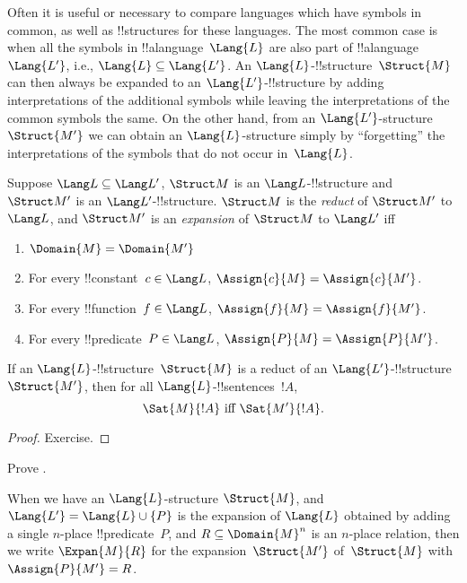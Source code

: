 \documentclass[../../../include/open-logic-section]{subfiles}
\begin{document}

Often it is useful or necessary to compare languages which have
symbols in common, as well as !!{structure}s for these languages.  The
most common case is when all the symbols in !!a{language}~$\Lang{L}$
are also part of !!a{language}~$\Lang{L'}$, i.e., $\Lang{L} \subseteq
\Lang{L'}$. An $\Lang{L}$-!!{structure}~$\Struct{M}$ can then always
be expanded to an $\Lang{L'}$-!!{structure} by adding interpretations
of the additional symbols while leaving the interpretations of the
common symbols the same.  On the other hand, from an
$\Lang{L'}$-structure~$\Struct{M'}$ we can obtain an
$\Lang{L}$-structure simply by ``forgetting'' the interpretations of
the symbols that do not occur in~$\Lang{L}$.

\begin{defn}
Suppose $\Lang L \subseteq \Lang L'$, $\Struct M$ is an
$\Lang L$-!!{structure} and $\Struct M'$ is an $\Lang L'$-!!{structure}.
$\Struct M$ is the \emph{reduct} of $\Struct M'$ to $\Lang L$, and
$\Struct M'$ is an \emph{expansion} of $\Struct M$ to $\Lang L'$ iff
\begin{enumerate}
\item $\Domain{M} = \Domain{M'}$
\item For every !!{constant}~$c \in \Lang L$, $\Assign{c}{M} =
  \Assign{c}{M'}$.
\item For every !!{function}~$f \in \Lang L$, $\Assign{f}{M} =
  \Assign{f}{M'}$.
\item For every !!{predicate}~$P \in \Lang L$, $\Assign{P}{M} =
  \Assign{P}{M'}$.
\end{enumerate}
\end{defn}

\begin{prop}
If an $\Lang{L}$-!!{structure}~$\Struct{M}$ is a reduct of an
$\Lang{L'}$-!!{structure}~$\Struct{M'}$, then for all
$\Lang{L}$-!!{sentence}s~$!A$,
\[
\Sat{M}{!A} \text{ iff } \Sat{M'}{!A}.
\]
\end{prop}

\begin{proof}
  Exercise.
\end{proof}

\begin{prob}
Prove .
\end{prob}

\begin{defn}
When we have an $\Lang{L}$-structure $\Struct{M}$, and $\Lang{L'} =
\Lang{L} \cup \{P\}$ is the expansion of $\Lang{L}$ obtained by adding
a single $n$-place !!{predicate}~$P$, and $R \subseteq \Domain{M}^n$
is an $n$-place relation, then we write $\Expan{M}{R}$ for the
expansion~$\Struct{M'}$ of~$\Struct{M}$ with $\Assign{P}{M'} = R$.
\end{defn}
\end{document}
